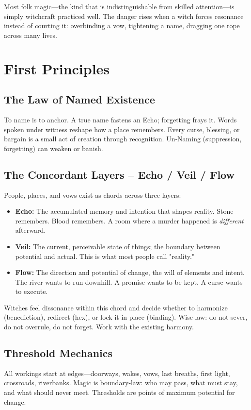 \documentclass[10pt,a5paper]{book}
\begin{document}
Most folk magic---the kind that is indistinguishable from skilled attention---is simply witchcraft practiced well. The danger rises when a witch forces resonance instead of courting it: overbinding a vow, tightening a name, dragging one rope across many lives.

\section{First Principles}

\subsection{The Law of Named Existence}
To name is to anchor. A true name fastens an Echo; forgetting frays it. Words spoken under witness reshape how a place remembers. Every curse, blessing, or bargain is a small act of creation through recognition. Un‑Naming (suppression, forgetting) can weaken or banish.

\subsection{The Concordant Layers -- Echo / Veil / Flow}
People, places, and vows exist as chords across three layers:

\begin{itemize}
    \item \textbf{Echo:} The accumulated memory and intention that shapes reality. Stone remembers. Blood remembers. A room where a murder happened is \textit{different} afterward.
    \item \textbf{Veil:} The current, perceivable state of things; the boundary between potential and actual. This is what most people call "reality."
    \item \textbf{Flow:} The direction and potential of change, the will of elements and intent. The river wants to run downhill. A promise wants to be kept. A curse wants to execute.
\end{itemize}

Witches feel dissonance within this chord and decide whether to harmonize (benediction), redirect (hex), or lock it in place (binding). Wise law: do not sever, do not overrule, do not forget. Work with the existing harmony.

\subsection{Threshold Mechanics}
All workings start at edges---doorways, wakes, vows, last breaths, first light, crossroads, riverbanks. Magic is boundary‑law: who may pass, what must stay, and what should never meet. Thresholds are points of maximum potential for change.
\end{document}
